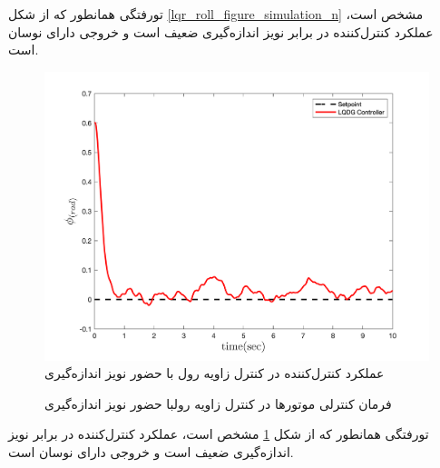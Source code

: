 ‌تورفتگی همانطور که از شکل
\ref{lqr_roll_figure_simulation_n}
مشخص است، عملکرد کنترل‌کننده  در برابر نویز اندازه‌گیری ضعیف است و خروجی دارای نوسان است.



\begin{figure}[H]
	\includegraphics[width=.48\linewidth]{../Figures/MIL/LQDG/Roll/lqdg_roll.png}
	\centering
	\caption{عملكرد کنترل‌کننده   در کنترل زاويه رول با حضور نويز اندازه‌گیری}
	\label{lqdg_roll_fig_simulation_n}
\end{figure}
\begin{figure}[H]
	\centering
	\caption{‫‪فرمان کنترلی موتورها در کنترل زاویه رولبا حضور نويز اندازه‌گیری}
\end{figure}
‌تورفتگی همانطور که از شکل
\ref{lqdg_roll_fig_simulation_n}
مشخص است، عملکرد کنترل‌کننده  در برابر نویز اندازه‌گیری ضعیف است و خروجی دارای نوسان است.





